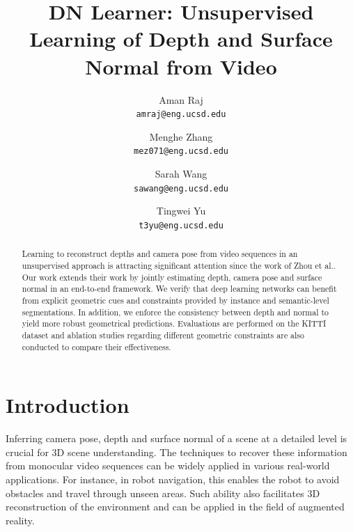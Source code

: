 \documentclass[10pt,twocolumn,letterpaper]{article}
\begin{document}
\title{DN Learner: Unsupervised Learning of Depth and Surface Normal from Video}

\author{Aman Raj\\
{\tt\small amraj@eng.ucsd.edu}
\and
Menghe Zhang\\
{\tt\small mez071@eng.ucsd.edu}
\and
Sarah Wang\\
{\tt\small sawang@eng.ucsd.edu}
\and
Tingwei Yu\\
{\tt\small t3yu@eng.ucsd.edu}}

\maketitle

\begin{abstract}

Learning to reconstruct depths and camera pose from video sequences in an unsupervised approach is attracting significant attention since the work of Zhou et al.\cite{zhou2017unsupervised}. 
Our work extends their work by jointly estimating depth, camera pose and surface normal in an end-to-end framework. We verify that deep learning networks can benefit from explicit geometric cues and constraints provided by instance and semantic-level segmentations. In addition, we enforce the consistency between depth and normal to yield more robust geometrical predictions. Evaluations are performed on the KITTI dataset\cite{kitti} and ablation studies regarding different geometric constraints are also conducted to compare their effectiveness.  

\end{abstract}


\section{Introduction}
Inferring camera pose, depth and surface normal of a scene at a detailed level is crucial for 3D scene understanding. The techniques to recover these information from monocular video sequences can be widely applied in various real-world applications. For instance, in robot navigation, this enables the robot to avoid obstacles and travel through unseen areas. Such ability also facilitates 3D reconstruction of the environment and can be applied in the field of augmented reality. 
\end{document}
